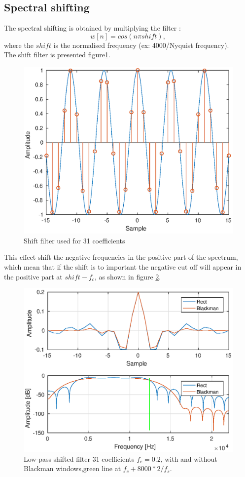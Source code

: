 \documentclass[twoside,twocolumn]{article}
\begin{document}
\subsection{Spectral shifting}
The spectral shifting is obtained by multiplying the filter :
\begin{equation}
w[n]=cos(n\pi shift),
\end{equation}
	where the $shift$ is the normalised frequency (ex: 4000/Nyquist frequency).\\
	The shift filter is presented figure\ref{shiftfilt}. 
	\begin{figure}[h!]
		\centering
		\includegraphics[scale=0.5]{./images/shiftfilt.eps}
		\caption{Shift filter used for 31 coefficients}
		\label{shiftfilt}
	\end{figure}
This effect shift the negative frequencies in the positive part of the spectrum, which mean that if the shift is to important the negative cut off will appear in the positive part at $shift-f_c$, as shown in figure \ref{shifted}. 

\begin{figure}[h!]
	\centering
	\includegraphics[scale=0.5]{./images/shifted.eps}
	\caption{Low-pass shifted filter 31 coefficients $f_{c}=0.2$, with and without Blackman windows,green line at $f_c+8000*2/f_s$.}
	\label{shifted}
\end{figure}
\end{document}

